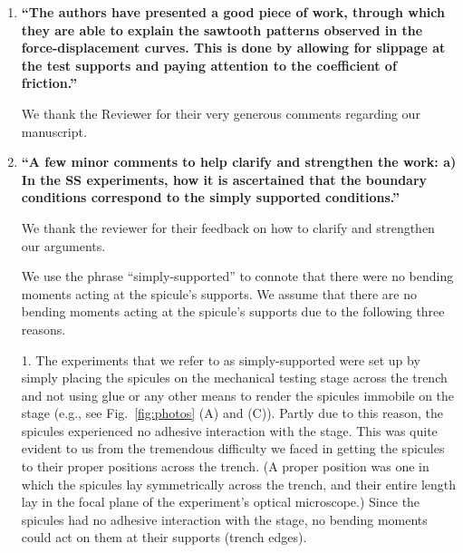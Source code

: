 \documentclass[11pt,letterpaper]{report}
\begin{document}
\begin{enumerate}[label=\textit{1.\arabic*},wide, labelwidth=!, labelindent=0pt]

\item \label{r1c1} {\bf ``The authors have presented a good piece of work, through which they are able to explain the sawtooth patterns observed in the force-displacement curves. This is done by allowing for slippage at the test supports and paying attention to the coefficient of friction.''}



We thank the Reviewer for their very generous comments regarding our manuscript.

\newpage
\item \label{r1c2} {\bf ``A few minor comments to help clarify and strengthen the work: a) In the SS experiments, how it is ascertained that the boundary conditions correspond to the simply supported conditions.''}


We thank the reviewer for their feedback on how to clarify and strengthen our arguments.


We use the phrase ``simply-supported'' to connote that there were no bending moments acting at the spicule's supports. We assume that there are no bending moments acting at the spicule's supports due to the following three reasons.

1. The experiments that we refer to as simply-supported were set up by simply placing the spicules on the mechanical testing stage across the trench and not using glue or any other means to render the spicules immobile on the stage (e.g., see Fig.~\ref{fig:photos} (A) and (C)). Partly due to this reason, the spicules experienced no adhesive interaction with the stage. This was  quite evident to us from the  tremendous difficulty we faced in getting the spicules to their proper positions across the trench. (A proper position was one in which
the spicules lay symmetrically across the trench, and their entire length lay in the focal plane of the experiment's optical microscope.)  Since the spicules had no adhesive interaction with the stage, no bending moments could act on them at their supports (trench edges).


\end{enumerate}
\end{document}
